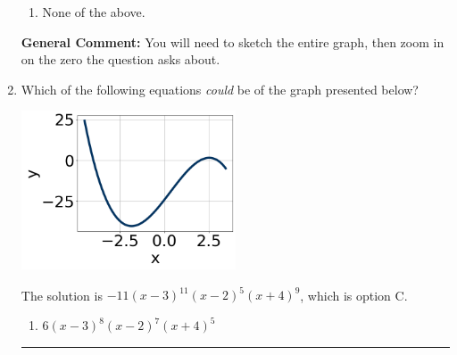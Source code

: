 \documentclass{extbook}[14pt]
\newcommand{\litem}[1]{\item #1

\rule{\textwidth}{0.4pt}}
\begin{document}
\begin{enumerate}
{\begin{enumerate}[label=\Alph*.]
\item None of the above.\end{enumerate}
\textbf{General Comment:} You will need to sketch the entire graph, then zoom in on the zero the question asks about.
}
\litem{
Which of the following equations \textit{could} be of the graph presented below?

\begin{center}
    \includegraphics[width=0.5\textwidth]{../Figures/polyGraphToFunctionCopyB.png}
\end{center}


The solution is \( -11(x - 3)^{11} (x - 2)^{5} (x + 4)^{9} \), which is option C.\begin{enumerate}[label=\Alph*.]
\item \( 6(x - 3)^{8} (x - 2)^{7} (x + 4)^{5} \)


\end{enumerate}}
\end{enumerate}
\end{document}
